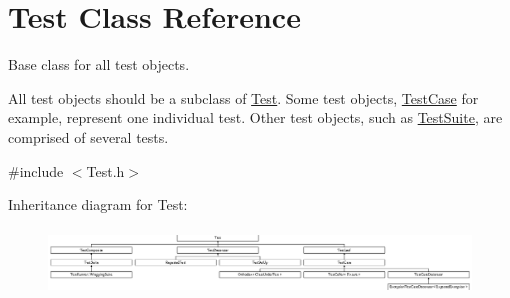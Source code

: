 \hypertarget{class_test}{\section{Test Class Reference}
\label{class_test}
}


Base class for all test objects.

All test objects should be a subclass of \hyperlink{class_test}{Test}. Some test objects, \hyperlink{class_test_case}{Test\-Case} for example, represent one individual test. Other test objects, such as \hyperlink{class_test_suite}{Test\-Suite}, are comprised of several tests.  




{\ttfamily \#include $<$Test.\-h$>$}

Inheritance diagram for Test\-:\begin{figure}[H]
\begin{center}
\leavevmode
\includegraphics[height=1.777778cm]{class_test}
\end{center}
\end{figure}
